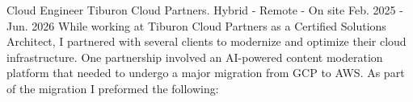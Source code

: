 

\begin{cventries}

  \cventry
    {Cloud Engineer} %
    {Tiburon Cloud Partners.} %
    {Hybrid - Remote - On site} %
    {Feb. 2025 - Jun. 2026} %
    {
      While working at Tiburon Cloud Partners as a Certified Solutions Architect, I partnered with several clients to modernize and optimize their cloud infrastructure. One partnership involved an AI-powered content moderation platform that needed to undergo a major migration from GCP to AWS. As part of the migration I preformed the following:
}
\end{cventries}
